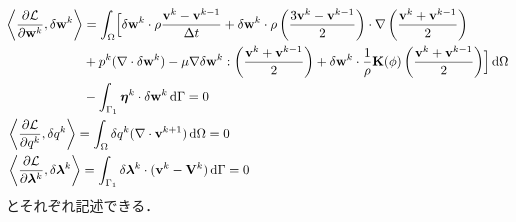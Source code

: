 \begin{align}
    &\begin{aligned}
        \label{eq:foward_w}
        \left\langle\frac{\partial \mathcal{L}}{\partial \mathbf{w}^k}, \delta {\mathbf{w}}^k\right\rangle
        &= \int_{\Omega} \Bigl[\delta {\mathbf{w}}^{k} \cdot \rho\frac{\mathbf{v}^{k}-\mathbf{v}^{k-1}}{\Delta t}
        +\delta {\mathbf{w}}^{k} \cdot \rho \left(\frac{3\mathbf{v}^{k} - \mathbf{v}^{k-1}}{2}\right) \cdot \nabla \left(\frac{\mathbf{v}^{k} + \mathbf{v}^{k-1}}{2}\right) \\
        &+ p^{k} (\nabla \cdot \delta {\mathbf{w}}^{k})
        - \mu \nabla \delta {\mathbf{w}}^{k} : \left(\frac{\mathbf{v}^{k} + \mathbf{v}^{k-1}}{2}\right)
        + \delta {\mathbf{w}}^{k} \cdot \frac{1}{\rho}\mathbf{K}(\phi) \left(\frac{\mathbf{v}^{k} + \mathbf{v}^{k-1}}{2}\right) \Bigr] \, \mathrm{d}\Omega \\
        &- \int_{\Gamma_1} \boldsymbol{\eta}^{k} \cdot \delta {\mathbf{w}}^{k} \, \mathrm{d}\Gamma = 0
    \end{aligned} \\
    \label{eq:foward_q} 
    & \left\langle\frac{\partial \mathcal{L}}{\partial q^k}, \delta {q}^k\right\rangle
    =\int_{\Omega} \delta {q}^k(\nabla \cdot \mathbf{v}^{k+1}) \, \mathrm{d}\Omega
    = 0 \\
    \label{eq:foward_lambda} 
    &\left\langle\frac{\partial \mathcal{L}}{\partial \boldsymbol{\lambda}^k}, \delta \boldsymbol{\lambda}^k\right\rangle
    = \int_{\Gamma_1} \delta \boldsymbol{\lambda}^k \cdot (\mathbf{v}^{k} - \mathbf{V}^{k}) \, \mathrm{d}\Gamma
    = 0
\end{align}
とそれぞれ記述できる．

